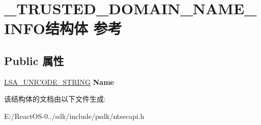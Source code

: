 \hypertarget{struct___t_r_u_s_t_e_d___d_o_m_a_i_n___n_a_m_e___i_n_f_o}{}\section{\+\_\+\+T\+R\+U\+S\+T\+E\+D\+\_\+\+D\+O\+M\+A\+I\+N\+\_\+\+N\+A\+M\+E\+\_\+\+I\+N\+F\+O结构体 参考}
\label{struct___t_r_u_s_t_e_d___d_o_m_a_i_n___n_a_m_e___i_n_f_o}
\subsection*{Public 属性}
\begin{DoxyCompactItemize}
\item 
\mbox{\label{struct___t_r_u_s_t_e_d___d_o_m_a_i_n___n_a_m_e___i_n_f_o_a89fd682a1e06c1b8b55fa9864d4cbc41}} 
\hyperlink{struct___l_s_a___u_n_i_c_o_d_e___s_t_r_i_n_g}{L\+S\+A\+\_\+\+U\+N\+I\+C\+O\+D\+E\+\_\+\+S\+T\+R\+I\+NG} {\bfseries Name}
\end{DoxyCompactItemize}


该结构体的文档由以下文件生成\+:\begin{DoxyCompactItemize}
\item 
E\+:/\+React\+O\+S-\/0../sdk/include/psdk/ntsecapi.\+h\end{DoxyCompactItemize}
